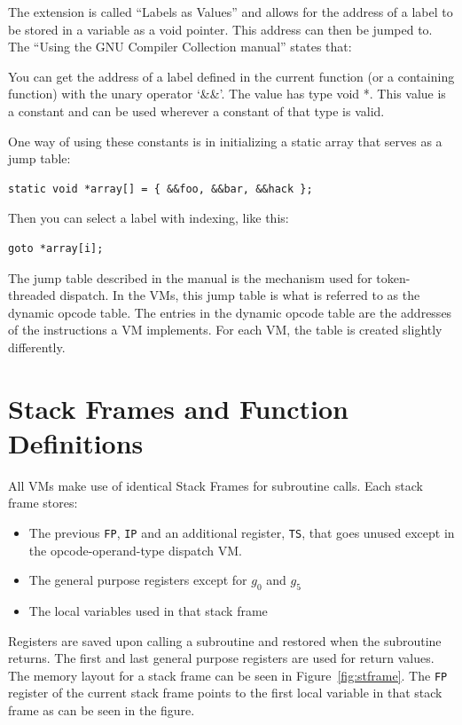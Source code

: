 \documentclass[english,a4paper,12pt]{report}
\begin{document}
The extension is called ``Labels as Values'' and allows for the
address of a label to be stored in a variable as a void pointer. This
address can then be jumped to. The ``Using the GNU Compiler Collection
manual''\cite[page 371]{GCC} states that:

\begin{displayquote}
  You can get the address of a label defined in the current function
  (or a containing function) with the unary operator `\&\&'. The value
  has type void *. This value is a constant and can be used wherever a
  constant of that type is valid.
	
  One way of using these constants is in initializing a static array
  that serves as a jump table:
	\begin{lstlisting}
static void *array[] = { &&foo, &&bar, &&hack };
	\end{lstlisting}
	
	Then you can select a label with indexing, like this:
	\begin{lstlisting}
goto *array[i];	
	\end{lstlisting}
\end{displayquote}

The jump table described in the manual is the mechanism used for
token-threaded dispatch. In the VMs, this jump table is what is
referred to as the dynamic opcode table. The entries in the dynamic
opcode table are the addresses of the instructions a VM
implements. For each VM, the table is created slightly differently.

\section{Stack Frames and Function Definitions}

All VMs make use of identical Stack Frames for subroutine calls. Each
stack frame stores:

\begin{itemize}
	\item The previous \verb|FP|, \verb|IP| and an additional register,
	\verb|TS|, that goes unused except in the opcode-operand-type
	dispatch VM.
	\item The general purpose registers except for $g_0$ and $g_5$
	\item The local variables used in that stack frame
\end{itemize}

Registers are saved upon calling a subroutine and restored when the
subroutine returns. The first and last general purpose registers are
used for return values. The memory layout for a stack frame can be
seen in Figure~\ref{fig:stframe}. The \verb|FP| register of the
current stack frame points to the first local variable in that stack
frame as can be seen in the figure.
\end{document}

